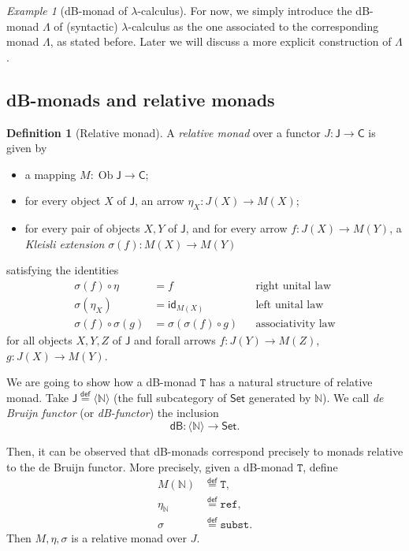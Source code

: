 \documentclass[a4paper,twoside,12pt]{article}
\theoremstyle{definition}
\newtheorem{definition}{Definition}
\theoremstyle{remark}
\theoremstyle{example}
\newtheorem{example}{Example}
\DeclareMathOperator{\Ob}{Ob}
\newcommand{\NN}{\mathbb{N}}
\newcommand{\TT}{\mathtt{T}}
\newcommand{\subst}{\mathtt{subst}}
\newcommand{\refe}{\mathtt{ref}}
\begin{document}
\begin{example}[dB-monad of $\lambda$-calculus]
  For now, we simply introduce the dB-monad $\mathsf{\Lambda}$ of
  (syntactic) $\lambda$-calculus as the one associated to the
  corresponding monad $\Lambda$, as stated before.  Later we will
  discuss a more explicit construction of $\mathtt{\Lambda}$.
\end{example}

\subsection{dB-monads and relative monads}
\label{sec:subst-rel-monads}

\begin{definition}[Relative monad]
  A \emph{relative monad} over a functor
  $J\colon \mathsf{J}\to \mathsf{C}$ is given by
  \begin{itemize}
  \item a mapping $M:\Ob \mathsf{J} \to \mathsf{C}$;
  \item for every object $X$ of $\mathsf{J}$, an arrow $\eta_X\colon
    J(X) \to M(X)$;
  \item for every pair of objects $X,Y$ of $\mathsf{J}$, and for every
    arrow $f\colon J(X) \to M(Y)$, a \emph{Kleisli extension}
    $\sigma(f) \colon M(X) \to M(Y)$
  \end{itemize}
  satisfying the identities
  \begin{align*}
    \sigma(f) \circ \eta &= f &&\text{right unital law} \\
    \sigma(\eta_X) &= \mathsf{id}_{M(X)} &&\text{left unital law} \\
    \sigma(f) \circ \sigma(g) &= \sigma(\sigma(f) \circ g) &&\text{associativity law}
  \end{align*}
  for all objects $X,Y,Z$ of $\mathsf{J}$ and forall arrows
  $f\colon J(Y)\to M(Z)$, $g\colon J(X)\to M(Y)$.
\end{definition}

We are going to show how a dB-monad $\TT$ has a natural structure of
relative monad.  Take
$\mathsf{J} \stackrel{\mathsf{def}}{=}\langle \NN \rangle$ (the full
subcategory of $\mathsf{Set}$ generated by $\NN$).  We call \emph{de
  Bruijn functor} (or \emph{dB-functor}) the inclusion
\begin{equation}
  \label{eq:dB-functor}
  \mathsf{dB}\colon \langle \NN \rangle \to \mathsf{Set}.
\end{equation}

Then, it can be observed that dB-monads correspond precisely to monads
relative to the de Bruijn functor.  More precisely, given a dB-monad
$\TT$, define
\begin{align*}
  M(\NN) &\stackrel{\mathsf{def}}{=} \TT, \\
  \eta_\NN &\stackrel{\mathsf{def}}{=} \refe, \\
  \sigma &\stackrel{\mathsf{def}}{=} \subst.
\end{align*}
Then $M,\eta,\sigma$ is a relative monad over $J$.
\end{document}
